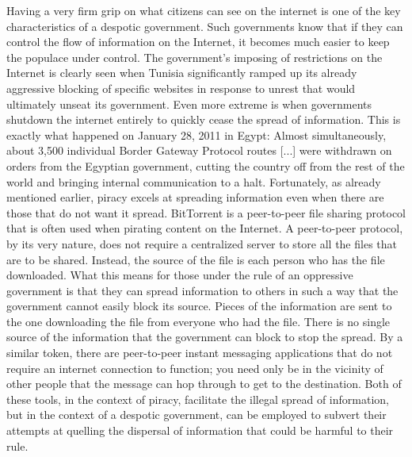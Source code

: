 \documentclass[onecolumn, 12pt]{article}
\begin{document}
Having a very firm grip on what citizens can see on the internet is one of the key
characteristics of a despotic government. Such governments know that if they can control
the flow of information on the Internet, it becomes much easier to keep the populace under
control. The government's imposing of restrictions on the Internet is clearly seen when
 {Tunisia significantly ramped up its already aggressive
blocking of specific websites in response to unrest that would ultimately unseat its
government.} Even more extreme is when governments shutdown the internet entirely to
quickly cease the spread of information. This is exactly what happened on January 28, 2011
in Egypt:  {Almost simultaneously, about 3,500 individual
Border Gateway Protocol routes [...] were withdrawn on orders from the Egyptian
government, cutting the country off from the rest of the world and bringing internal
communication to a halt.} Fortunately, as already mentioned earlier, piracy excels at
spreading information even when there are those that do not want it spread. BitTorrent is
a peer-to-peer file sharing protocol that is often used when pirating content on the
Internet. A peer-to-peer protocol, by its very nature, does not require a centralized
server to store all the files that are to be shared. Instead, the source of the file is
each person who has the file downloaded. What this means for those under the rule of an
oppressive government is that they can spread information to others in such a way that the
government cannot easily block its source. Pieces of the information are sent to the one
downloading the file from everyone who had the file. There is no single source of the
information that the government can block to stop the spread. By a similar token, there
are peer-to-peer instant messaging applications that do not require an internet connection
to function; you need only be in the vicinity of other people that the message can hop
through to get to the destination. Both of these tools, in the context of piracy, facilitate
the illegal spread of information, but in the context of a despotic government, can be
employed to subvert their attempts at quelling the dispersal of information that could be
harmful to their rule.
\end{document}
